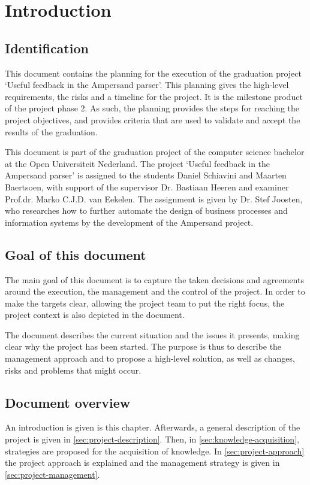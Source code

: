 \section{Introduction}
\subsection{Identification}
%
This document contains the planning for the execution of the graduation project `Useful feedback in the Ampersand parser'.
This planning gives the high-level requirements, the risks and a timeline for the project.
It is the milestone product of the project phase 2.
As such, the planning provides the steps for reaching the project objectives, and provides criteria that are used to validate and accept the results of the graduation.

This document is part of the graduation project of the computer science bachelor at the Open Universiteit Nederland.
The project `Useful feedback in the Ampersand parser' is assigned to the students Daniel Schiavini and Maarten Baertsoen, with support of the supervisor Dr. Bastiaan Heeren and examiner Prof.dr. Marko C.J.D. van Eekelen.
The assignment is given by Dr. Stef Joosten, who researches how to further automate the design of business processes and information systems by the development of the Ampersand project.

\subsection{Goal of this document}
The main goal of this document is to capture the taken decisions and agreements around the execution, the management and the control of the project.
In order to make the targets clear, allowing the project team to put the right focus, the project context is also depicted in the document.

The document describes the current situation and the issues it presents, making clear why the project has been started.
The purpose is thus to describe the management approach and to propose a high-level solution, as well as changes, risks and problems that might occur.

\subsection{Document overview}
An introduction is given is this chapter.
Afterwards, a general description of the project is given in \autoref{sec:project-description}.
Then, in \autoref{sec:knowledge-acquisition}, strategies are proposed for the acquisition of knowledge.
In \autoref{sec:project-approach} the project approach is explained and the management strategy is given in \autoref{sec:project-management}.


